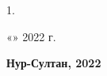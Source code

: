 \documentclass[a4paper,12pt]{article}
\begin{document}
\begin{titlepage}
\begin{spacing}{1.}
	\vspace{1\baselineskip}
	\begin{flushright}
	    «\makebox[1.5cm]{\hrulefill}» \makebox[4cm]{\hrulefill} 2022 г.
	\end{flushright}
	
	\vspace{3\baselineskip}
	\begin{center}
	    \bfseries
	    Нур-Султан, 2022
	\end{center}
	
	\end{spacing}
\end{titlepage}
	
                                                                        

		\clearpage
		\tableofcontents
		\clearpage
    
		\newpage
\end{document}
